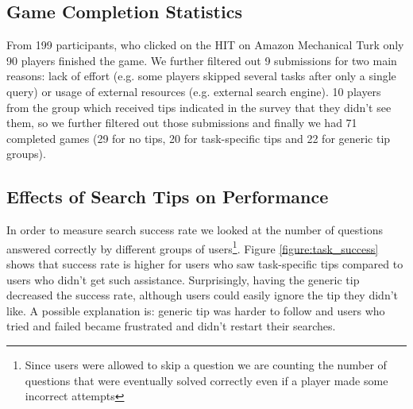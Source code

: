 \documentclass{sig-alternate}
\begin{document}
\subsection{Game Completion Statistics}

From 199 participants, who clicked on the HIT on Amazon Mechanical Turk only 90 players finished the game.
We further filtered out 9 submissions for two main reasons: lack of effort (e.g. some players skipped several tasks after only a single query) or usage of external resources (e.g. external search engine).
10 players from the group which received tips indicated in the survey that they didn't see them, so we further filtered out those submissions and finally we had 71 completed games (29 for no tips, 20 for task-specific tips and 22 for generic tip groups).

\vspace{-1mm}
\subsection{Effects of Search Tips on Performance}

In order to measure search success rate we looked at the number of questions answered correctly by different groups of users\footnote{Since users were allowed to skip a question we are counting the number of questions that were eventually solved correctly even if a player made some incorrect attempts}. Figure \ref{figure:task_success} shows that success rate is higher for users who saw task-specific tips compared to users who didn't get such assistance.
Surprisingly, having the generic tip decreased the success rate, although users could easily ignore the tip they didn't like.
A possible explanation is: generic tip was harder to follow and users who tried and failed became frustrated and didn't restart their searches.

\end{document}
